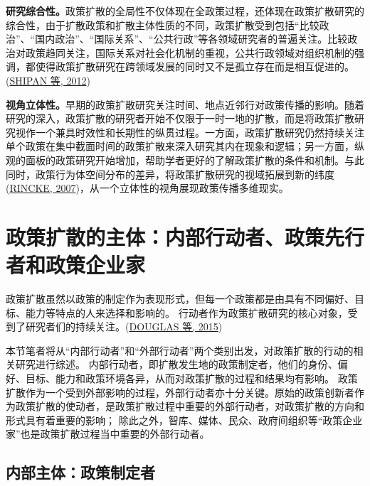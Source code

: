 \documentclass[
  12pt,
]{ctexart}
\begin{document}
\textbf{研究综合性。}政策扩散的全局性不仅体现在全政策过程，还体现在政策扩散研究的综合性，由于扩散政策和扩散主体性质的不同，政策扩散受到包括``比较政治''、``国内政治''、``国际关系''、``公共行政''等各领域研究者的普遍关注。比较政治对政策趋同关注，国际关系对社会化机制的重视，公共行政领域对组织机制的强调，都使得政策扩散研究在跨领域发展的同时又不是孤立存在而是相互促进的。(\protect\hyperlink{ref-ShipanVolden2012}{SHIPAN 等, 2012})

\textbf{视角立体性。}早期的政策扩散研究关注时间、地点近邻行对政策传播的影响。随着研究的深入，政策扩散的研究者开始不仅限于一时一地的扩散，而是将政策扩散研究视作一个兼具时效性和长期性的纵贯过程。一方面，政策扩散研究仍然持续关注单个政策在集中截面时间的政策扩散来深入研究其内在现象和逻辑；另一方面，纵观的面板的政策研究开始增加，帮助学者更好的了解政策扩散的条件和机制。与此同时，政策行为体空间分布的差异，将政策扩散研究的视域拓展到新的纬度(\protect\hyperlink{ref-Rincke2007}{RINCKE, 2007})，从一个立体性的视角展现政策传播多维现实。

\newpage

\hypertarget{ux653fux7b56ux6269ux6563ux7684ux4e3bux4f53ux5185ux90e8ux884cux52a8ux8005ux653fux7b56ux5148ux884cux8005ux548cux653fux7b56ux4f01ux4e1aux5bb6}{%
\section{政策扩散的主体：内部行动者、政策先行者和政策企业家}\label{ux653fux7b56ux6269ux6563ux7684ux4e3bux4f53ux5185ux90e8ux884cux52a8ux8005ux653fux7b56ux5148ux884cux8005ux548cux653fux7b56ux4f01ux4e1aux5bb6}}

政策扩散虽然以政策的制定作为表现形式，但每一个政策都是由具有不同偏好、目标、能力等特点的人来选择和影响的。
行动者作为政策扩散研究的核心对象，受到了研究者们的持续关注。(\protect\hyperlink{ref-DouglasEtAl2015}{DOUGLAS 等, 2015})

本节笔者将从``内部行动者''和``外部行动者''两个类别出发，对政策扩散的行动的相关研究进行综述。
内部行动者，即扩散发生地的政策制定者，他们的身份、偏好、目标、能力和政策环境各异，从而对政策扩散的过程和结果均有影响。
政策扩散作为一个受到外部影响的过程，外部行动者亦十分关键。原始的政策创新者作为政策扩散的使动者，是政策扩散过程中重要的外部行动者，对政策扩散的方向和形式具有着重要的影响；
除此之外，智库、媒体、民众、政府间组织等``政策企业家''也是政策扩散过程当中重要的外部行动者。

\hypertarget{ux5185ux90e8ux4e3bux4f53ux653fux7b56ux5236ux5b9aux8005}{%
\subsection{内部主体：政策制定者}\label{ux5185ux90e8ux4e3bux4f53ux653fux7b56ux5236ux5b9aux8005}}
\end{document}
